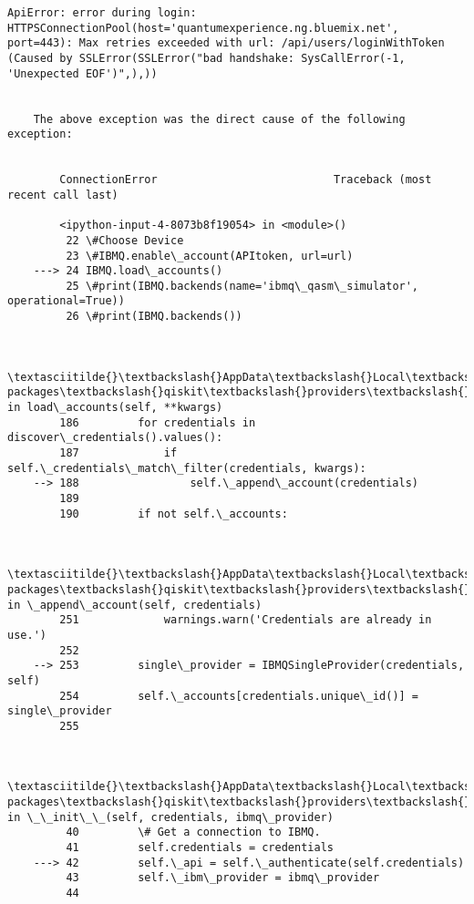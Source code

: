 \documentclass[11pt]{article}
\begin{document}
\begin{Verbatim}[commandchars=\\\{\}]
        ApiError: error during login: HTTPSConnectionPool(host='quantumexperience.ng.bluemix.net', port=443): Max retries exceeded with url: /api/users/loginWithToken (Caused by SSLError(SSLError("bad handshake: SysCallError(-1, 'Unexpected EOF')",),))

        
    The above exception was the direct cause of the following exception:
    

        ConnectionError                           Traceback (most recent call last)

        <ipython-input-4-8073b8f19054> in <module>()
         22 \#Choose Device
         23 \#IBMQ.enable\_account(APItoken, url=url)
    ---> 24 IBMQ.load\_accounts()
         25 \#print(IBMQ.backends(name='ibmq\_qasm\_simulator', operational=True))
         26 \#print(IBMQ.backends())
    

        \textasciitilde{}\textbackslash{}AppData\textbackslash{}Local\textbackslash{}Continuum\textbackslash{}anaconda3\textbackslash{}lib\textbackslash{}site-packages\textbackslash{}qiskit\textbackslash{}providers\textbackslash{}ibmq\textbackslash{}ibmqprovider.py in load\_accounts(self, **kwargs)
        186         for credentials in discover\_credentials().values():
        187             if self.\_credentials\_match\_filter(credentials, kwargs):
    --> 188                 self.\_append\_account(credentials)
        189 
        190         if not self.\_accounts:
    

        \textasciitilde{}\textbackslash{}AppData\textbackslash{}Local\textbackslash{}Continuum\textbackslash{}anaconda3\textbackslash{}lib\textbackslash{}site-packages\textbackslash{}qiskit\textbackslash{}providers\textbackslash{}ibmq\textbackslash{}ibmqprovider.py in \_append\_account(self, credentials)
        251             warnings.warn('Credentials are already in use.')
        252 
    --> 253         single\_provider = IBMQSingleProvider(credentials, self)
        254         self.\_accounts[credentials.unique\_id()] = single\_provider
        255 
    

        \textasciitilde{}\textbackslash{}AppData\textbackslash{}Local\textbackslash{}Continuum\textbackslash{}anaconda3\textbackslash{}lib\textbackslash{}site-packages\textbackslash{}qiskit\textbackslash{}providers\textbackslash{}ibmq\textbackslash{}ibmqsingleprovider.py in \_\_init\_\_(self, credentials, ibmq\_provider)
         40         \# Get a connection to IBMQ.
         41         self.credentials = credentials
    ---> 42         self.\_api = self.\_authenticate(self.credentials)
         43         self.\_ibm\_provider = ibmq\_provider
         44 
    


\end{Verbatim}
\end{document}
